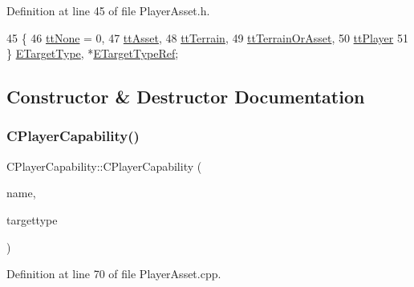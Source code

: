 Definition at line 45 of file Player\+Asset.\+h.


\begin{DoxyCode}
45                     \{
46               \hyperlink{classCPlayerCapability_a9d3450ed1532fd536bd6cbb1e2eef02fac78f0e806a6b0ead030d63c27c9ce929}{ttNone} = 0,
47               \hyperlink{classCPlayerCapability_a9d3450ed1532fd536bd6cbb1e2eef02facb6ee2a28b5d50b9d3009c272f2881aa}{ttAsset},
48               \hyperlink{classCPlayerCapability_a9d3450ed1532fd536bd6cbb1e2eef02fa465193c39da3100a1ce87c4a01a7ec2f}{ttTerrain},
49               \hyperlink{classCPlayerCapability_a9d3450ed1532fd536bd6cbb1e2eef02fa67cc6d11bc0aafc1b786bd6557ba4aa2}{ttTerrainOrAsset},
50               \hyperlink{classCPlayerCapability_a9d3450ed1532fd536bd6cbb1e2eef02fafa6672fe0ac4e39cb5908cd5438b824f}{ttPlayer}
51         \} \hyperlink{classCPlayerCapability_a9d3450ed1532fd536bd6cbb1e2eef02f}{ETargetType}, *\hyperlink{classCPlayerCapability_aaf4a5763a2fa5b81c138c52da0888e87}{ETargetTypeRef};
\end{DoxyCode}


\subsection{Constructor \& Destructor Documentation}
\hypertarget{classCPlayerCapability_a303de62aba5d3f65d9a8e013c64a96c1}{}\label{classCPlayerCapability_a303de62aba5d3f65d9a8e013c64a96c1} 
\subsubsection{\texorpdfstring{C\+Player\+Capability()}{CPlayerCapability()}}
{\footnotesize\ttfamily C\+Player\+Capability\+::\+C\+Player\+Capability (\begin{DoxyParamCaption}\item[{const std\+::string \&}]{name,  }\item[{\hyperlink{classCPlayerCapability_a9d3450ed1532fd536bd6cbb1e2eef02f}{E\+Target\+Type}}]{targettype }\end{DoxyParamCaption})\hspace{0.3cm}{\ttfamily [protected]}}



Definition at line 70 of file Player\+Asset.\+cpp.


